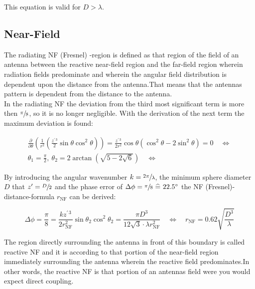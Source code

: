 This equation is valid for $D > \lambda$. \cite{balanis}

\subsection{Near-Field}

The radiating \ac{NF} (Fresnel) -region is defined \cite{balanis} as \glqq that region of the field of an antenna between the reactive near-field region and the far-field region wherein radiation fields predominate and wherein the angular field distribution is dependent upon the distance from the antenna.\grqq{ }That means that the antennas pattern is dependent from the distance to the antenna.\\
In the radiating \ac{NF} the deviation from the third most significant term is more then $\sfrac{\pi}{8}$, so it is no longer negligible. With the derivation of the next term the maximum deviation is found:

\begin{align}
\frac{\partial}{\partial\theta}\left(\frac{1}{r^2}\left(\frac{z^{\prime\, 3}}{2}\sin\theta\cos^2\theta\right)\right) = \frac{z^{\prime\, 3}}{2r^2}\cos\theta\left(\cos^2\theta-2\sin^2\theta\right) = 0 \quad \Leftrightarrow\\ 
\theta_1 = \frac{\pi}{2},\ \theta_2=2\arctan\left(\sqrt{5-2\sqrt{6}}\right) \quad \Leftrightarrow
\end{align}

By introducing the angular wavenumber $k=\sfrac{2\pi}{\lambda}$, the minimum sphere diameter $D$ that $z'=\sfrac{D}{2}$ and the phase error of $\Delta\phi = \sfrac{\pi}{8} \ \widehat{=}\  22.5^\circ$ the \ac{NF} (Fresnel)-distance-formula $r_{\text{NF}}$ can be derived:

\begin{equation}
\Delta\phi = \frac{\pi}{8} = \frac{kz^{\prime\, 3}}{2r_{\text{NF}}^2}\sin\theta_2\cos^2\theta_2= \frac{\pi D^3}{12\sqrt{3}\cdot\lambda r_{\text{NF}}^2} \quad \Leftrightarrow \quad r_{\text{NF}}=0.62\sqrt{\frac{D^3}{\lambda}}
\end{equation}

The region directly surrounding the antenna in front of this boundary is called reactive \ac{NF} and it is according to \cite{balanis} \glqq that portion of the near-field region immediately surrounding the antenna wherein the reactive field predominates.\grqq{ }In other words, the reactive \ac{NF} is that portion of an antennas field were you would expect direct coupling.

